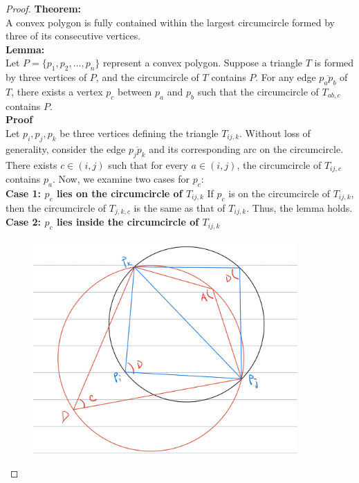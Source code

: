 \documentclass{article}
\begin{document}
\begin{proof}
    \textbf{Theorem: }
    \\
    A convex polygon is fully contained within the largest circumcircle formed by three of its consecutive vertices.
    \\
    \textbf{Lemma: }
    \\
    Let \( P = \{p_1, p_2, \ldots, p_n\} \) represent a convex polygon. Suppose a triangle \( T \) is formed by three vertices of \( P \), and the circumcircle of \( T \) contains \( P \). For any edge \( \overline{p_a p_b} \) of \( T \), there exists a vertex \( p_c \) between \( p_a \) and \( p_b \) such that the circumcircle of \( T_{ab,c} \) contains \( P \).
    \\
    \textbf{Proof}
    \\
    Let \( p_i, p_j, p_k \) be three vertices defining the triangle \( T_{ij,k} \). Without loss of generality, consider the edge \( \overline{p_jp_k} \) and its corresponding arc on the circumcircle. There exists \( c \in (i, j) \) such that for every \( a \in (i, j) \), the circumcircle of \( T_{ij,c} \) contains \( p_a \).
    Now, we examine two cases for \( p_c \):
    \\
    \textbf{Case 1: \( p_c \) lies on the circumcircle of \( T_{ij,k} \)}
    If \( p_c \) is on the circumcircle of \( T_{ij,k} \), then the circumcircle of \( T_{j,k,c} \) is the same as that of \( T_{ij,k} \). Thus, the lemma holds.
    \\
    \textbf{Case 2: \( p_c \) lies inside the circumcircle of \( T_{ij,k} \)}
    \begin{figure}[h]
        \centering
        \includegraphics[width=0.9\textwidth]{HW5_Q2_Proof_Helper_Graph.jpg}

\end{figure}
\end{proof}
\end{document}
